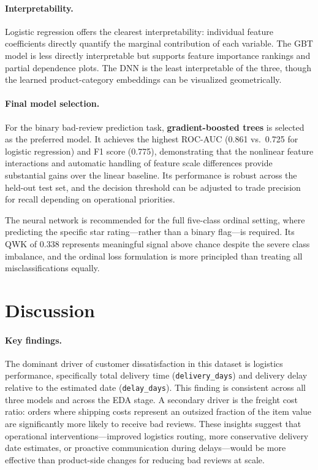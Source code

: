 \documentclass[11pt]{article}
\begin{document}
\paragraph{Interpretability.}
Logistic regression offers the clearest interpretability: individual feature coefficients directly quantify the marginal contribution of each variable. The GBT model is less directly interpretable but supports feature importance rankings and partial dependence plots. The DNN is the least interpretable of the three, though the learned product-category embeddings can be visualized geometrically.

\paragraph{Final model selection.}
For the binary bad-review prediction task, \textbf{gradient-boosted trees} is selected as the preferred model. It achieves the highest ROC-AUC (0.861 vs.\ 0.725 for logistic regression) and F1 score (0.775), demonstrating that the nonlinear feature interactions and automatic handling of feature scale differences provide substantial gains over the linear baseline. Its performance is robust across the held-out test set, and the decision threshold can be adjusted to trade precision for recall depending on operational priorities.

The neural network is recommended for the full five-class ordinal setting, where predicting the specific star rating---rather than a binary flag---is required. Its QWK of 0.338 represents meaningful signal above chance despite the severe class imbalance, and the ordinal loss formulation is more principled than treating all misclassifications equally.

\section{Discussion}

\paragraph{Key findings.}
The dominant driver of customer dissatisfaction in this dataset is logistics performance, specifically total delivery time (\texttt{delivery\_days}) and delivery delay relative to the estimated date (\texttt{delay\_days}). This finding is consistent across all three models and across the EDA stage. A secondary driver is the freight cost ratio: orders where shipping costs represent an outsized fraction of the item value are significantly more likely to receive bad reviews. These insights suggest that operational interventions---improved logistics routing, more conservative delivery date estimates, or proactive communication during delays---would be more effective than product-side changes for reducing bad reviews at scale.
\end{document}
